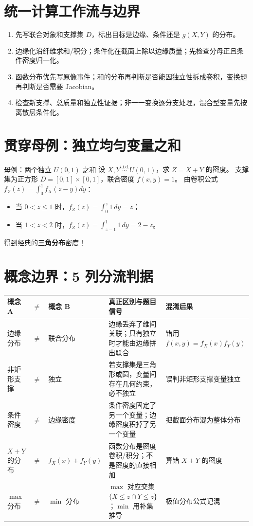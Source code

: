 \documentclass[11pt,a4paper]{ctexart}
\newcommand{\kw}[1]{\textbf{\color{deep}#1}}
\begin{document}
\section{统一计算工作流与边界}

\begin{enumerate}
  \item 先写联合对象和支撑集 $D$，标出目标是边缘、条件还是 $g(X,Y)$ 的分布。
  \item 边缘化沿纤维求和/积分；条件化在截面上除以边缘质量；先检查分母正且条件密度归一化。
  \item 函数分布优先写原像事件；和的分布再判断是否能因独立性拆成卷积，变换题再判断是否需要 Jacobian。
  \item 检查新支撑、总质量和独立性证据；非一一变换逐分支处理，混合型变量先按离散层条件化。
\end{enumerate}

\section{贯穿母例：独立均匀变量之和}

\begin{examplebox}{母例：两个独立 $U(0,1)$ 之和}
设 $X, Y \overset{\text{i.i.d.}}{\sim} U(0,1)$，求 $Z = X + Y$ 的密度。
支撑集为正方形 $D = [0,1] \times [0,1]$，联合密度 $f(x,y) = 1$。
由卷积公式 $f_Z(z) = \int_0^1 f_X(z-y) dy$：
\begin{itemize}
  \item 当 $0 < z \le 1$ 时，$f_Z(z) = \int_0^z 1 \, dy = z$；
  \item 当 $1 < z < 2$ 时，$f_Z(z) = \int_{z-1}^1 1 \, dy = 2 - z$。
\end{itemize}
得到经典的\kw{三角分布}密度！
\end{examplebox}

\section{概念边界：5 列分流判据}

\small
\begin{longtable}{L{2.8cm}L{2.8cm}L{3.4cm}L{3.2cm}L{2.8cm}}
\toprule
\textbf{概念 A} & \textbf{$\ne$} & \textbf{概念 B} & \textbf{真正区别与题目信号} & \textbf{混淆后果}\\
\midrule
边缘分布 & $\ne$ & 联合分布 & 边缘丢弃了维间关联；只有独立时才能由边缘拼出联合 & 错用 $f(x,y)=f_X(x)f_Y(y)$\\
非矩形支撑 & $\ne$ & 独立 & 若支撑集是三角形或圆，变量间存在几何约束，必不独立 & 误判非矩形支撑变量独立\\
条件密度 & $\ne$ & 边缘密度 & 条件密度固定了另一个变量；边缘密度积掉了另一个变量 & 把截面分布混为整体分布\\
$X+Y$ 的分布 & $\ne$ & $f_X(x)+f_Y(y)$ & 函数分布是密度卷积/积分；不是密度的直接相加 & 算错 $X+Y$ 的密度\\
$\max$ 分布 & $\ne$ & $\min$ 分布 & $\max$ 对应交集 $\{X \le z \cap Y \le z\}$；$\min$ 用补集推导 & 极值分布公式记混\\
\bottomrule
\end{longtable}
\normalsize
\end{document}
